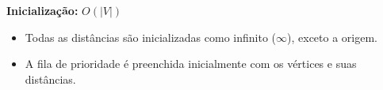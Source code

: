 \documentclass[preview]{standalone}
\begin{document}
\begin{center}
\textbf{Inicialização:} $O(|V|)$
            \begin{itemize}
                \item Todas as distâncias são inicializadas como infinito ($\infty$), exceto a origem.
                \item A fila de prioridade é preenchida inicialmente com os vértices e suas distâncias.
            \end{itemize}
\end{center}
\end{document}
